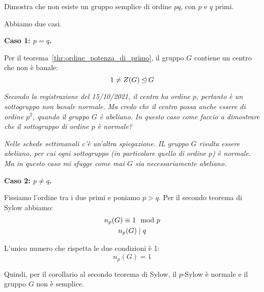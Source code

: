 \begin{esercizio}
    \label{ex:gruppo_ordine_pq}
    Dimostra che non esiste un gruppo semplice di ordine $pq$, con $p$ e $q$ primi.
\end{esercizio}
\begin{soluzione}
    Abbiamo due casi.

    \bigskip
    \textbf{Caso 1: $p = q$.}

    Per il teorema~\ref{thr:ordine_potenza_di_primo}, il gruppo $G$ contiene un centro che non è banale:
    \begin{equation*}
        1 \ne Z(G) \unlhd G
    \end{equation*}

    \emph{Secondo la registrazione del 15/10/2021, il centro ha ordine $p$, pertanto è un sottogruppo non banale normale.}
    \emph{Ma credo che il centro possa anche essere di ordine $p^2$, quando il gruppo $G$ è abeliano.}
    \emph{In questo caso come faccio a dimostrare che il sottogruppo di ordine $p$ è normale?}

    \emph{Nelle schede settimanali c'è un'altra spiegazione.}
    \emph{IL gruppo $G$ risulta essere abeliano, per cui ogni sottogruppo (in particolare quello di ordine $p$) è normale.}
    \emph{Ma in questo caso mi sfugge come mai $G$ sia necessariamente abeliano.}

    \bigskip
    \textbf{Caso 2: $p \ne q$.}

    Fissiamo l'ordine tra i due primi e poniamo $p > q$.
    Per il secondo teorema di Sylow abbiamo:
    \begin{gather*}
        n_p(G) \equiv 1 \mod p \\
        n_p(G) \mid q
    \end{gather*}

    L'unico numero che rispetta le due condizioni è 1:
    \begin{equation*}
        n_p(G) = 1
    \end{equation*}

    Quindi, per il corollario al secondo teorema di Sylow, il $p$-Sylow è normale e il gruppo $G$ non è semplice.
\end{soluzione}

